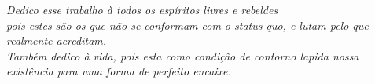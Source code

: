 \begin{dedicatoria}
   \vspace*{\fill}
   \centering
   \noindent

   \textit{Dedico esse trabalho à todos os espíritos livres e rebeldes \\ pois estes são os que não se conformam com o status quo, e lutam pelo que realmente acreditam.\\Também dedico à vida, pois esta como condição de contorno lapida nossa existência para uma forma de perfeito encaixe.} \vspace*{\fill}
\end{dedicatoria}
